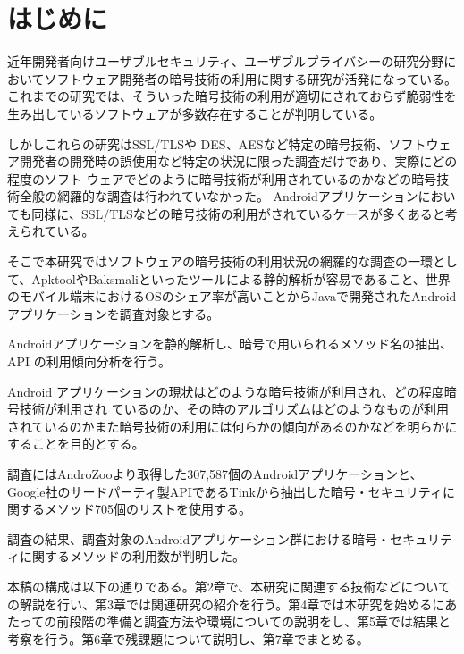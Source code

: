 \newpage
\section{はじめに} 
近年開発者向けユーザブルセキュリティ、ユーザブルプライバシーの研究分野においてソフトウェア開発者の暗号技術の利用に関する研究が活発になっている。
これまでの研究では、そういった暗号技術の利用が適切にされておらず脆弱性を生み出しているソフトウェアが多数存在することが判明している。

しかしこれらの研究はSSL/TLSや DES、AESなど特定の暗号技術、ソフトウェア開発者の開発時の誤使用など特定の状況に限った調査だけであり、実際にどの程度のソフト
ウェアでどのように暗号技術が利用されているのかなどの暗号技術全般の網羅的な調査は行われていなかった。
Androidアプリケーションにおいても同様に、SSL/TLSなどの暗号技術の利用がされているケースが多くあると考えられている。

そこで本研究ではソフトウェアの暗号技術の利用状況の網羅的な調査の一環として、ApktoolやBaksmaliといったツールによる静的解析が容易であること、世界のモバイル端末におけるOSのシェア率が高いこと\cite{share}からJavaで開発されたAndroidアプリケーションを調査対象とする。

Androidアプリケーションを静的解析し、暗号で用いられるメソッド名の抽出、API の利用傾向分析を行う。

Android アプリケーションの現状はどのような暗号技術が利用され、どの程度暗号技術が利用され
ているのか、その時のアルゴリズムはどのようなものが利用されているのかまた暗号技術の利用には何らかの傾向があるのかなどを明らかにすることを目的とする。

調査にはAndroZooより取得した307,587個のAndroidアプリケーションと、
Google社のサードパーティ製APIであるTinkから抽出した暗号・セキュリティに関するメソッド705個のリストを使用する。

調査の結果、調査対象のAndroidアプリケーション群における暗号・セキュリティに関するメソッドの利用数が判明した。

本稿の構成は以下の通りである。第2章で、本研究に関連する技術などについての解説を行い、第3章では関連研究の紹介を行う。第4章では本研究を始めるにあたっての前段階の準備と調査方法や環境についての説明をし、第5章では結果と考察を行う。第6章で残課題について説明し、第7章でまとめる。
